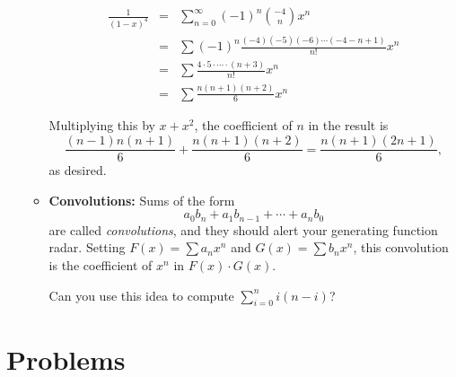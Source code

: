 \documentclass[12pt]{article}
\begin{document}
\begin{itemize}
\begin{itemize}
\begin{eqnarray*}
\frac{1}{(1-x)^4} &=& \sum_{n=0}^\infty (-1)^n\binom{-4}{n}x^n \\
&=&\sum (-1)^n\frac{(-4)(-5)(-6)\cdots(-4-n+1)}{n!}x^n \\
     &=& \sum \frac{4\cdot 5\cdot \cdots\cdot (n+3)}{n!} x^n \\
     &=& \sum \frac{n(n+1)(n+2)}{6}x^n
\end{eqnarray*}

Multiplying this by $x+x^2$, the coefficient of $n$ in the result is $$\frac{(n-1)n(n+1)}{6}+\frac{n(n+1)(n+2)}{6}=\frac{n(n+1)(2n+1)}{6},$$ as desired.

\item \textbf{Convolutions:}  Sums of the form $$a_0b_n+a_1b_{n-1}+\cdots+a_nb_0$$ are called \textit{convolutions}, and they should alert your generating function radar.  Setting $F(x)=\sum a_nx^n$ and $G(x)=\sum b_nx^n$, this convolution is the coefficient of $x^n$ in $F(x)\cdot G(x)$.

Can you use this idea to compute $\sum_{i=0}^n i(n-i)$?

\end{itemize}

\end{itemize}

\section*{Problems}
\end{document}
